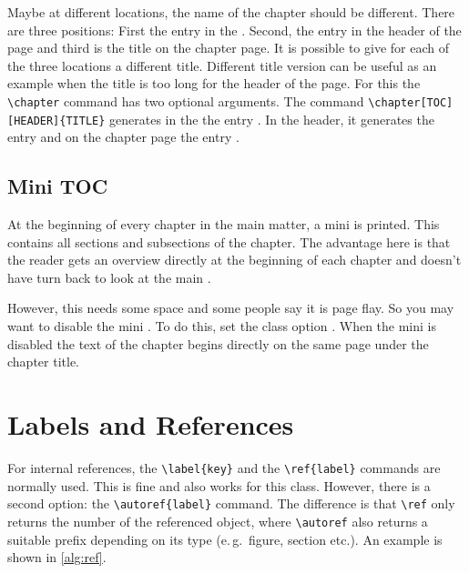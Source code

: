 Maybe at different locations, the name of the chapter should be different.
There are three positions: First the entry in the . Second, the entry
in the header of the page and third is the title on the chapter page. It is
possible to give for each of the three locations a different title. Different
title version can be useful as an example when the title is too long for the
header of the page. For this the \verb!\chapter! command has two optional
arguments.  The command \verb!\chapter[TOC][HEADER]{TITLE}! generates in the
 the entry . In the header, it generates the entry 
and on the chapter page the entry .

\subsection{Mini TOC}%
\label{opt:mintoc}

At the beginning of every chapter in the main matter, a mini  is
printed. This contains all sections and subsections of the chapter. The
advantage here is that the reader gets an overview directly at the beginning
of each chapter and doesn't have turn back to look at the main .

However, this needs some space and some people say it is page flay. So you may
want to disable the mini . To do this, set the class option
. When the mini  is disabled
the text of the chapter begins directly on the same page under the chapter
title.


\section{Labels and References}%
\label{cmd:ref}

For internal references, the \verb!\label{key}! and the \verb!\ref{label}!
commands are normally used. This is fine and also works for this class.
However, there is a second option: the \verb!\autoref{label}! command. The
difference is that \verb!\ref! only returns the number of the referenced
object, where \verb!\autoref! also returns a suitable prefix depending on its
type (e.\,g.\ figure, section etc.). An example is shown in \autoref{alg:ref}.

